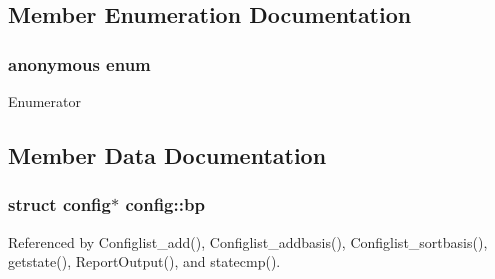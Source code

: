 \subsection{Member Enumeration Documentation}
\hypertarget{structconfig_a3c18b366a1f919f2f9f27c814376259f}{\subsubsection[{anonymous enum}]{\setlength{\rightskip}{0pt plus 5cm}anonymous enum}}\label{structconfig_a3c18b366a1f919f2f9f27c814376259f}
\begin{Desc}
\item[Enumerator]\par
\begin{description}
\item[{\em 
\hypertarget{structconfig_a3c18b366a1f919f2f9f27c814376259fa30b3ac7763c70e948cc9cdd60551ec07}{C\-O\-M\-P\-L\-E\-T\-E}\label{structconfig_a3c18b366a1f919f2f9f27c814376259fa30b3ac7763c70e948cc9cdd60551ec07}
}]\item[{\em 
\hypertarget{structconfig_a3c18b366a1f919f2f9f27c814376259fa829cdb4c4ba84323cb0a2f4ca2217f7c}{I\-N\-C\-O\-M\-P\-L\-E\-T\-E}\label{structconfig_a3c18b366a1f919f2f9f27c814376259fa829cdb4c4ba84323cb0a2f4ca2217f7c}
}]\end{description}
\end{Desc}


\subsection{Member Data Documentation}
\hypertarget{structconfig_a3b790fb1757e3950f7a4cfca10e2b8a7}{
\subsubsection[{bp}]{\setlength{\rightskip}{0pt plus 5cm}struct {\bf config}$\ast$ config\-::bp}}\label{structconfig_a3b790fb1757e3950f7a4cfca10e2b8a7}


Referenced by Configlist\-\_\-add(), Configlist\-\_\-addbasis(), Configlist\-\_\-sortbasis(), getstate(), Report\-Output(), and statecmp().

